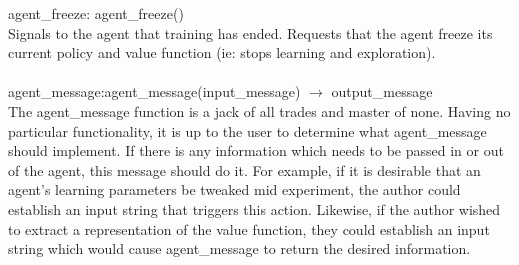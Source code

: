 \documentclass[11pt]{article}
\begin{document}
agent\_freeze: agent\_freeze()\\
Signals to the agent that training has ended. Requests that the agent freeze its current policy and value function (ie: stops learning and exploration).
\\\\
agent\_message:agent\_message(input\_message) $\rightarrow$ output\_message\\
The agent\_message function is a jack of all trades and master of none. Having no particular functionality, it is up to the user to determine what agent\_message should implement. If there is any information which needs to be passed in or out of the agent, this message should do it. For example, if it is desirable that an agent's learning parameters be tweaked mid experiment, the author could establish an input string that triggers this action. Likewise, if the author wished to extract a representation of the value function, they could establish an input string which would cause agent\_message to return the desired information.
                          
\end{document}
